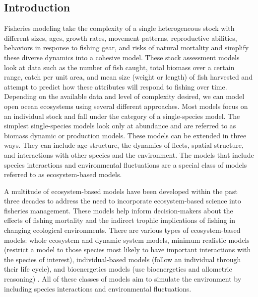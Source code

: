 \documentclass[oneside,12pt,final]{sty/ucthesis-CA2012}
\let\cite\citep                             %
\begin{document}
\begin{mainmatter}
\chapter{Introduction}
Fisheries modeling take the complexity of a single heterogeneous stock with different sizes, ages, growth rates, movement patterns, reproductive abilities, behaviors in response to fishing gear, and risks of natural mortality and simplify these diverse dynamics into a cohesive model. These stock assessment models look at data such as the number of fish caught, total biomass over a certain range, catch per unit area, and mean size (weight or length) of fish harvested and attempt to predict how these attributes will respond to fishing over time. Depending on the available data and level of complexity desired, we can model open ocean ecosystems using several different approaches. Most models focus on an individual stock and fall under the category of a single-species model. The simplest single-species models look only at abundance and are referred to as biomass dynamic or production models. These models can be extended in three ways. They can include age-structure, the dynamics of fleets, spatial structure, and interactions with other species and the environment. The models that include species interactions and environmental fluctuations are a special class of models referred to as ecosystem-based models.

\vspace{5mm}

A multitude of ecosystem-based models have been developed within the past three decades to address the need to incorporate ecosystem-based science into fisheries management. These models help inform decision-makers about the effects of fishing mortality and the indirect trophic implications of fishing in changing ecological environments. There are various types of ecosystem-based models: whole ecosystem and dynamic system models, minimum realistic models (restrict a model to those species most likely to have important interactions with the species of interest), individual-based models (follow an individual through their life cycle), and bioenergetics models (use bioenergetics and allometric reasoning) \cite{plaganyi2004critical,collie2014ecosystem}. All of these classes of models aim to simulate the environment by including species interactions and environmental fluctuations. 

\vspace{5mm}


\end{mainmatter}
\end{document}
